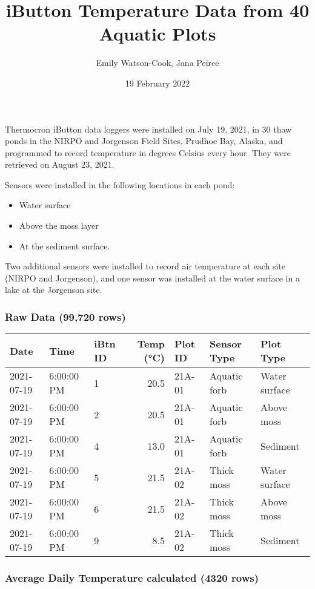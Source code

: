 \documentclass[
]{article}
\title{iButton Temperature Data from 40 Aquatic Plots}
\author{Emily Watson-Cook, Jana Peirce}
\date{19 February 2022}
\providecommand{\tightlist}{%
  \setlength{\itemsep}{0pt}\setlength{\parskip}{0pt}}
\begin{document}
\maketitle

Thermocron iButton data loggers were installed on July 19, 2021, in 30
thaw ponds in the NIRPO and Jorgenson Field Sites, Prudhoe Bay, Alaska,
and programmed to record temperature in degrees Celsius every hour. They
were retrieved on August 23, 2021.

Sensors were installed in the following locations in each pond:

\begin{itemize}
\tightlist
\item
  Water surface
\item
  Above the moss layer
\item
  At the sediment surface.
\end{itemize}

Two additional sensors were installed to record air temperature at each
site (NIRPO and Jorgenson), and one sensor was installed at the water
surface in a lake at the Jorgenson site.

\hypertarget{raw-data-99720-rows}{%
\subsubsection{Raw Data (99,720 rows)}\label{raw-data-99720-rows}}

\begin{longtable}[]{@{}lllrlll@{}}
\toprule
Date & Time & iBtn ID & Temp (°C) & Plot ID & Sensor Type & Plot Type \\
\midrule
\endhead
2021-07-19 & 6:00:00 PM & 1 & 20.5 & 21A-01 & Aquatic forb & Water
surface \\
2021-07-19 & 6:00:00 PM & 2 & 20.5 & 21A-01 & Aquatic forb & Above
moss \\
2021-07-19 & 6:00:00 PM & 4 & 13.0 & 21A-01 & Aquatic forb & Sediment \\
2021-07-19 & 6:00:00 PM & 5 & 21.5 & 21A-02 & Thick moss & Water
surface \\
2021-07-19 & 6:00:00 PM & 6 & 21.5 & 21A-02 & Thick moss & Above moss \\
2021-07-19 & 6:00:00 PM & 9 & 8.5 & 21A-02 & Thick moss & Sediment \\
\bottomrule
\end{longtable}

\hypertarget{average-daily-temperature-calculated-4320-rows}{%
\subsubsection{Average Daily Temperature calculated (4320
rows)}\label{average-daily-temperature-calculated-4320-rows}}
\end{document}
